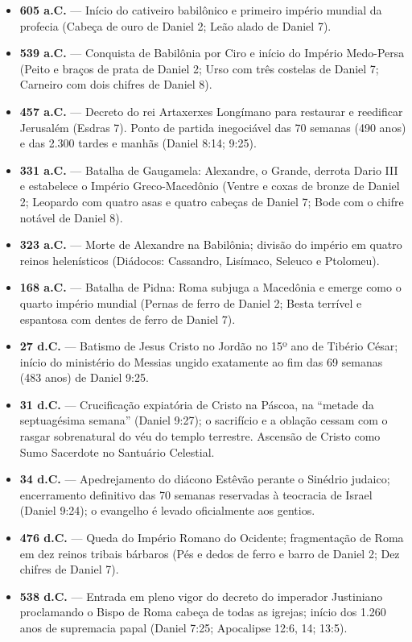 \documentclass[11pt,a4paper,openany]{book}
\begin{document}
\begin{itemize}
    \item \textbf{605 a.C.} --- Início do cativeiro babilônico e primeiro império mundial da profecia (Cabeça de ouro de Daniel 2; Leão alado de Daniel 7).
    \item \textbf{539 a.C.} --- Conquista de Babilônia por Ciro e início do Império Medo-Persa (Peito e braços de prata de Daniel 2; Urso com três costelas de Daniel 7; Carneiro com dois chifres de Daniel 8).
    \item \textbf{457 a.C.} --- Decreto do rei Artaxerxes Longímano para restaurar e reedificar Jerusalém (Esdras 7). Ponto de partida inegociável das 70 semanas (490 anos) e das 2.300 tardes e manhãs (Daniel 8:14; 9:25).
    \item \textbf{331 a.C.} --- Batalha de Gaugamela: Alexandre, o Grande, derrota Dario III e estabelece o Império Greco-Macedônio (Ventre e coxas de bronze de Daniel 2; Leopardo com quatro asas e quatro cabeças de Daniel 7; Bode com o chifre notável de Daniel 8).
    \item \textbf{323 a.C.} --- Morte de Alexandre na Babilônia; divisão do império em quatro reinos helenísticos (Diádocos: Cassandro, Lisímaco, Seleuco e Ptolomeu).
    \item \textbf{168 a.C.} --- Batalha de Pidna: Roma subjuga a Macedônia e emerge como o quarto império mundial (Pernas de ferro de Daniel 2; Besta terrível e espantosa com dentes de ferro de Daniel 7).
    \item \textbf{27 d.C.} --- Batismo de Jesus Cristo no Jordão no 15º ano de Tibério César; início do ministério do Messias ungido exatamente ao fim das 69 semanas (483 anos) de Daniel 9:25.
    \item \textbf{31 d.C.} --- Crucificação expiatória de Cristo na Páscoa, na ``metade da septuagésima semana'' (Daniel 9:27); o sacrifício e a oblação cessam com o rasgar sobrenatural do véu do templo terrestre. Ascensão de Cristo como Sumo Sacerdote no Santuário Celestial.
    \item \textbf{34 d.C.} --- Apedrejamento do diácono Estêvão perante o Sinédrio judaico; encerramento definitivo das 70 semanas reservadas à teocracia de Israel (Daniel 9:24); o evangelho é levado oficialmente aos gentios.
    \item \textbf{476 d.C.} --- Queda do Império Romano do Ocidente; fragmentação de Roma em dez reinos tribais bárbaros (Pés e dedos de ferro e barro de Daniel 2; Dez chifres de Daniel 7).
    \item \textbf{538 d.C.} --- Entrada em pleno vigor do decreto do imperador Justiniano proclamando o Bispo de Roma cabeça de todas as igrejas; início dos 1.260 anos de supremacia papal (Daniel 7:25; Apocalipse 12:6, 14; 13:5).

\end{itemize}
\end{document}
